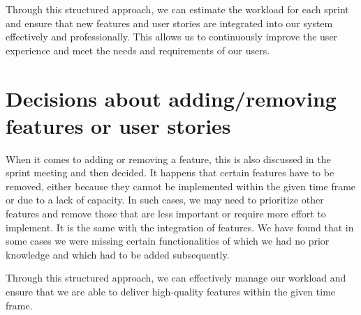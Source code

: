 \documentclass[12pt]{article}
\newcounter{fr}
\begin{document}
Through this structured approach, we can estimate the workload for each sprint and ensure that new features and user stories are integrated into our system effectively and professionally. This allows us to continuously improve the user experience and meet the needs and requirements of our users.

\section{Decisions about adding/removing features or user stories}
When it comes to adding or removing a feature, this is also discussed in the sprint meeting and then decided. It happens that certain features have to be removed, either because they cannot be implemented within the given time frame or due to a lack of capacity. In such cases, we may need to prioritize other features and remove those that are less important or require more effort to implement. It is the same with the integration of features. We have found that in some cases we were missing certain functionalities of which we had no prior knowledge and which had to be added subsequently.

Through this structured approach, we can effectively manage our workload and ensure that we are able to deliver high-quality features within the given time frame.
\end{document}
